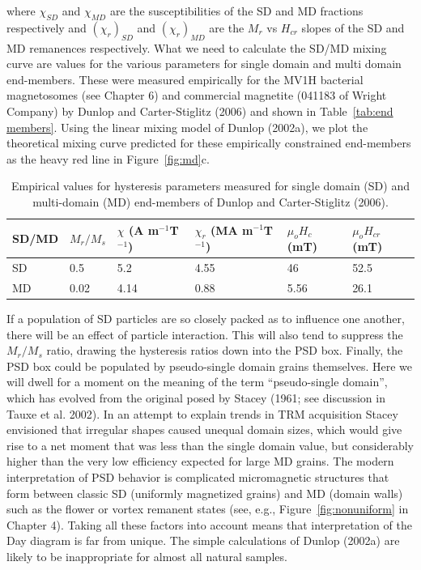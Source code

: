 \noindent where $\chi_{SD}$ and $\chi_{MD}$ are the susceptibilities of the SD and MD fractions respectively and $(\chi_r)_{SD}$  and $(\chi_r)_{MD}$ are the $M_r$ vs $H_{cr}$ slopes of the SD and MD remanences respectively.   What we need to calculate the SD/MD mixing curve are values for the  various parameters  for single domain and multi domain end-members.   These were measured empirically for the MV1H bacterial magnetosomes (see Chapter 6) and  commercial magnetite (041183 of Wright Company) by    Dunlop and Carter-Stiglitz (2006) \nocite{dunlop06}  and shown in Table~\ref{tab:end members}.    Using the linear mixing model of Dunlop (2002a), we  plot the theoretical mixing curve predicted for these empirically constrained  end-members as the heavy red line in Figure~\ref{fig:md}c.    

\begin{table}
\caption{Empirical values for hysteresis parameters measured for single domain (SD) and multi-domain (MD) end-members of  Dunlop and Carter-Stiglitz (2006).}
\label{tab:endmembers}
\begin{tabular}{ llllll   }
\hline
SD/MD& $M_r/M_s$ & $\chi$ (A m$^{-1}$T$^{-1}$) & $\chi_r$ (MA m$^{-1}$T$^{-1}$)&$ \mu_o H_c$ (mT) &$ \mu_o H_{cr}$ (mT)\\
\hline
SD & 0.5 &  5.2&  4.55&46 & 52.5\\
MD & 0.02 & 4.14 & 0.88 &5.56 &26.1\\
\hline
\end{tabular}
\end{table}




If a population of SD particles are so closely packed as to influence one another, there will be an effect of particle interaction.  This will also tend to suppress the $M_r/M_s$ ratio, drawing the hysteresis ratios down into the PSD box.  
Finally, the PSD box could be populated by pseudo-single domain grains themselves.  Here we will dwell for a moment on  the meaning of the term ``pseudo-single domain'', which  has evolved from the original posed by 
Stacey (1961; see  discussion in 
\nocite{tauxe02}
Tauxe et al. 2002). \nocite{stacey61,tauxe02}  In an attempt to explain trends in TRM acquisition Stacey envisioned that irregular shapes caused unequal domain sizes, which would give rise to a net moment that was less than the single domain value, but considerably higher than the very low efficiency expected for large MD grains.    The modern interpretation of PSD behavior is complicated micromagnetic structures that form between classic SD (uniformly magnetized grains) and MD (domain walls) such as the flower or vortex remanent states (see, e.g., Figure~\ref{fig:nonuniform} in Chapter 4).   
Taking all these factors into account means that interpretation of the Day diagram is far from unique.   The simple calculations of Dunlop (2002a) are likely to be  inappropriate for almost all natural samples.  






